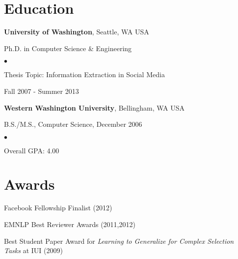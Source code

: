 \documentclass[margin,line]{res}
\newenvironment{list1}{
  \begin{list}{\ding{113}}{%
      \setlength{\itemsep}{0in}
      \setlength{\parsep}{0in} \setlength{\parskip}{0in}
      \setlength{\topsep}{0in} \setlength{\partopsep}{0in} 
      \setlength{\leftmargin}{0.17in}}}{\end{list}}
\newenvironment{list2}{
  \begin{list}{$\bullet$}{%
      \setlength{\itemsep}{0in}
      \setlength{\parsep}{0in} \setlength{\parskip}{0in}
      \setlength{\topsep}{0in} \setlength{\partopsep}{0in} 
      \setlength{\leftmargin}{0.2in}}}{\end{list}}
\begin{document}
\begin{resume}
\section{\sc Education}
{\bf University of Washington}, Seattle, WA USA\\
\vspace*{-.1in}
\begin{list1}
\item[] Ph.D. in Computer Science \& Engineering
\begin{list2}
\vspace*{.05in}
\item Thesis Topic: Information Extraction in Social Media
\item Fall 2007 - Summer 2013
\end{list2}
\end{list1}
{\bf Western Washington University}, Bellingham, WA USA\\
\vspace*{-.1in}
\begin{list1}
\item[] B.S./M.S., Computer Science,  December 2006
  \begin{list2}
    \vspace*{.05in}
    \item Overall GPA: 4.00
  \end{list2}
\end{list1}




\section{\sc Awards}

Facebook Fellowship Finalist (2012)
\vspace*{-2.5mm}

EMNLP Best Reviewer Awards (2011,2012)
\vspace*{-2.5mm}

Best Student Paper Award for \emph{Learning to Generalize for Complex Selection Tasks} at IUI (2009)
\vspace*{-2.5mm}


\end{resume}
\end{document}
